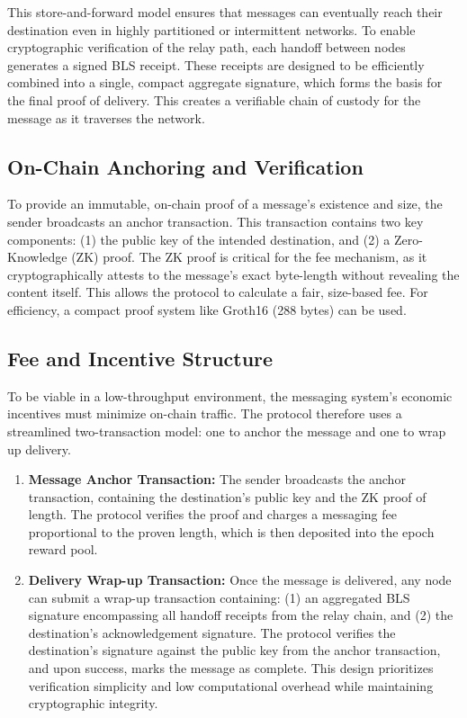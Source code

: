 \documentclass{article}
\begin{document}
This store-and-forward model ensures that messages can eventually reach their destination even in highly partitioned or intermittent networks. To enable cryptographic verification of the relay path, each handoff between nodes generates a signed BLS receipt. These receipts are designed to be efficiently combined into a single, compact aggregate signature, which forms the basis for the final proof of delivery. This creates a verifiable chain of custody for the message as it traverses the network.

\subsection{On-Chain Anchoring and Verification}

To provide an immutable, on-chain proof of a message's existence and size, the sender broadcasts an anchor transaction. This transaction contains two key components: (1) the public key of the intended destination, and (2) a Zero-Knowledge (ZK) proof. The ZK proof is critical for the fee mechanism, as it cryptographically attests to the message's exact byte-length without revealing the content itself. This allows the protocol to calculate a fair, size-based fee. For efficiency, a compact proof system like Groth16 (288 bytes) can be used.

\subsection{Fee and Incentive Structure}

To be viable in a low-throughput environment, the messaging system's economic incentives must minimize on-chain traffic. The protocol therefore uses a streamlined two-transaction model: one to anchor the message and one to wrap up delivery.

\begin{enumerate}
    \item \textbf{Message Anchor Transaction:} The sender broadcasts the anchor transaction, containing the destination's public key and the ZK proof of length. The protocol verifies the proof and charges a messaging fee proportional to the proven length, which is then deposited into the epoch reward pool.
    \item \textbf{Delivery Wrap-up Transaction:} Once the message is delivered, any node can submit a wrap-up transaction containing: (1) an aggregated BLS signature encompassing all handoff receipts from the relay chain, and (2) the destination's acknowledgement signature. The protocol verifies the destination's signature against the public key from the anchor transaction, and upon success, marks the message as complete. This design prioritizes verification simplicity and low computational overhead while maintaining cryptographic integrity.
\end{enumerate}
\end{document}
